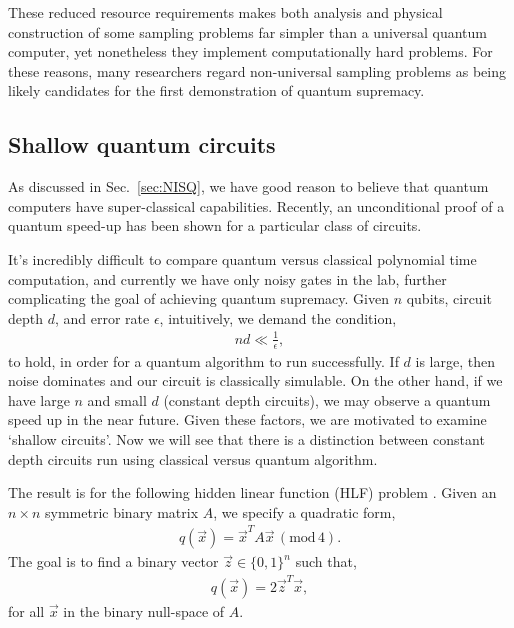 These reduced resource requirements makes both analysis and physical construction of some sampling problems far simpler than a universal quantum computer, yet nonetheless they implement computationally hard problems. For these reasons, many researchers regard non-universal sampling problems as being likely candidates for the first demonstration of quantum supremacy.

%
%

\subsection{Shallow quantum circuits}\label{sec:shallow_circs}

As discussed in Sec.~\ref{sec:NISQ}, we have good reason to believe that quantum computers have super-classical capabilities. Recently, an unconditional proof of a quantum speed-up has been shown for a particular class of circuits.

It's incredibly difficult to compare quantum versus classical polynomial time computation, and currently we have only noisy gates in the lab, further complicating the goal of achieving quantum supremacy. Given $n$ qubits, circuit depth $d$, and error rate $\epsilon$, intuitively, we demand the condition,
\begin{align}
nd \ll \frac{1}{\epsilon},
\end{align}
to hold, in order for a quantum algorithm to run successfully. If $d$ is large, then noise dominates and our circuit is classically simulable. On the other hand, if we have large $n$ and small $d$ (constant depth circuits), we may observe a quantum speed up in the near future. Given these factors, we are motivated to examine `shallow circuits'. Now we will see that there is a distinction between constant depth circuits run using classical versus quantum algorithm.

The result is for the following hidden linear function (HLF) problem \cite{bib:bravyi2018quantum}. Given an \mbox{$n\times n$} symmetric binary matrix $A$, we specify a quadratic form,
\begin{align}
q(\vec x) = \vec x^T A \vec x \, (\mathrm{mod} \,4).
\end{align}
The goal is to find a binary vector $\vec z \in \{0,1\}^n$ such that,
\begin{align}
q(\vec x) = 2 \vec z^T \vec x,
\end{align}
for all $\vec x$ in the binary null-space of $A$.

